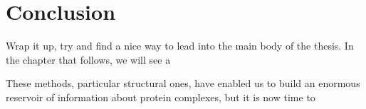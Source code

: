 \documentclass[a4paper,11pt,twoside,openright]{scrbook}
\begin{document}
\section{Conclusion}
Wrap it up, try and find a nice way to lead into the main body of the thesis. In the chapter that follows, we will see a

These methods, particular structural ones, have enabled us to build an enormous reservoir of information about protein complexes, but it is now time to

\printbibliography
\end{document}
